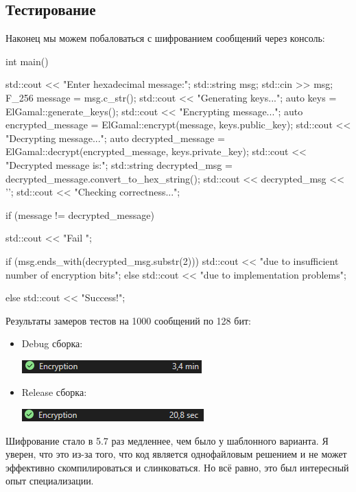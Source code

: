 \subsection{Тестирование}
Наконец мы можем побаловаться с шифрованием сообщений через консоль:
\begin{cppcode}
int main() {
    std::cout << "Enter hexadecimal message:\n";
    std::string msg;
    std::cin >> msg;
    F_256 message = msg.c_str();
    std::cout << "Generating keys...\n";
    auto keys = ElGamal::generate_keys();
    std::cout << "Encrypting message...\n";
    auto encrypted_message = ElGamal::encrypt(message, keys.public_key);
    std::cout << "Decrypting message...\n";
    auto decrypted_message = ElGamal::decrypt(encrypted_message, keys.private_key);
    std::cout << "Decrypted message is:\n";
    std::string decrypted_msg = decrypted_message.convert_to_hex_string();
    std::cout << decrypted_msg << '\n';
    std::cout << "Checking correctness...\n";

    if (message != decrypted_message) {
        std::cout << "Fail ";

        if (msg.ends_with(decrypted_msg.substr(2))) {
            std::cout << "due to insufficient number of encryption bits\n";
        } else {
            std::cout << "due to implementation problems\n";
        }
    } else {
        std::cout << "Success!\n";
    }
}
\end{cppcode}
Результаты замеров тестов на 1000 сообщений по 128 бит:
\begin{itemize}
  \item Debug сборка:

    \begin{center}
      \includegraphics{images/spec_debug.png}
    \end{center}

  \item Release сборка:

    \begin{center}
      \includegraphics{images/spec_release.png}
    \end{center}
\end{itemize}

Шифрование стало в 5.7 раз медленнее, чем было у шаблонного варианта. Я уверен, что это из-за того, что код является однофайловым решением и не может эффективно скомпилироваться и слинковаться. Но всё равно, это был интересный опыт специализации.


